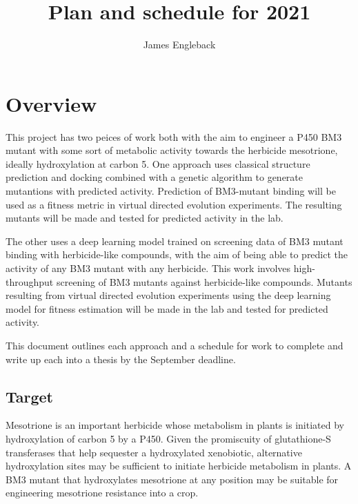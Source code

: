 \documentclass{article}
\author{James Engleback}
\begin{document}
\title{\textbf{Plan and schedule for 2021}}
\maketitle

\tableofcontents
\section{Overview}
\par

This project has two peices of work both with the aim to engineer a P450 BM3 mutant with some sort of metabolic activity towards the herbicide mesotrione, ideally hydroxylation at carbon 5. %
One approach uses classical structure prediction and docking combined with a genetic algorithm to generate mutantions with predicted activity. %
Prediction of BM3-mutant binding will be used as a fitness metric in virtual directed evolution experiments. The resulting mutants will be made and tested for predicted activity in the lab. %
\par
The other uses a deep learning model trained on screening data of BM3 mutant binding with herbicide-like compounds, with the aim of being able to predict the activity of any BM3 mutant with any herbicide.  %
This work involves high-throughput screening of BM3 mutants against herbicide-like compounds. %
Mutants resulting from virtual directed evolution experiments using the deep learning model for fitness estimation will be made in the lab and tested for predicted activity. %
\par
This document outlines each approach and a schedule for work to complete and write up each into a thesis by the September deadline. %
\par
\subsection{Target}
Mesotrione is an important herbicide whose metabolism in plants is initiated by hydroxylation of carbon 5 by a P450. Given the promiscuity of glutathione-S transferases that help sequester a hydroxylated xenobiotic, alternative hydroxylation sites may be sufficient to initiate herbicide metabolism in plants. %
A BM3 mutant that hydroxylates mesotrione at any position may be suitable for engineering mesotrione resistance into a crop. %
\par
\end{document}
